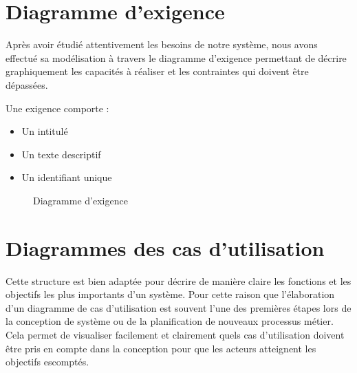 		\section{Diagramme d'exigence }
		Après avoir étudié attentivement les besoins de  notre système, nous avons effectué sa modélisation à travers le diagramme d'exigence permettant de décrire graphiquement les capacités à réaliser et les contraintes qui doivent être dépassées.
		
    	Une exigence comporte : 
		\begin{itemize}
			\item Un intitulé 
			
			\item Un texte descriptif 
			
			\item Un identifiant unique
		\end{itemize}
		
		\begin{figure}[H] 
			\begin{center} 
				\centering
		\hspace*{-2cm} 
				
				\caption{Diagramme d'exigence}
			\end{center}
			\end {figure}
		
			\section{Diagrammes des cas d'utilisation }\label{Cas d'utilisation}
			
			Cette structure est bien adaptée pour décrire de manière claire les fonctions et les objectifs les plus importants d'un système. Pour cette raison que l'élaboration d'un diagramme de cas d'utilisation est souvent l'une des premières étapes lors de la conception de système ou de la planification de nouveaux processus métier. Cela permet de visualiser facilement et clairement quels cas d'utilisation doivent être pris en compte dans la conception pour que les acteurs atteignent les objectifs escomptés. 
			
